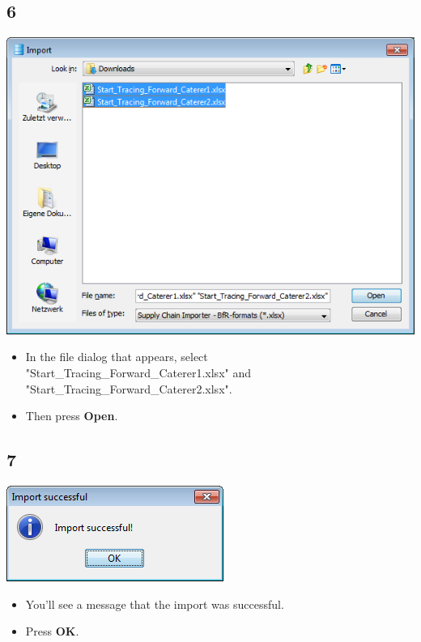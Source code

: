 \documentclass{beamer}
\begin{document}
\subsection{6}
\begin{frame}
	\begin{center}
  		\includegraphics[height=0.6\textheight]{6.png}
	\end{center}
	\begin{itemize}
		\item In the file dialog that appears, select "Start\_Tracing\_Forward\_Caterer1.xlsx" and "Start\_Tracing\_Forward\_Caterer2.xlsx".
		\item Then press \textbf{Open}.
	\end{itemize}
\end{frame}

\subsection{7}
\begin{frame}
	\begin{center}
  		\includegraphics[height=0.2\textheight]{7.png}
	\end{center}
	\begin{itemize}
		\item You'll see a message that the import was successful.
		\item Press \textbf{OK}.
	\end{itemize}
\end{frame}
\end{document}
